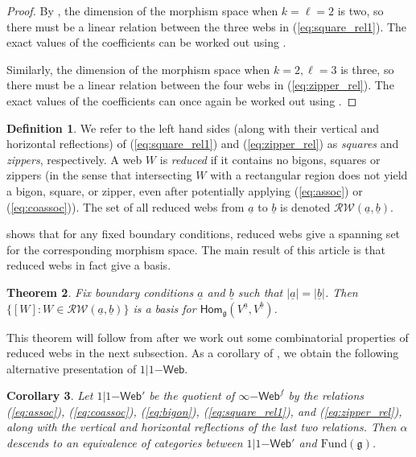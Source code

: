 \documentclass[11pt,a4paper,reqno]{amsart}
\newcommand{\g}{\mathfrak{g}}
\renewcommand{\a}{\alpha}
\renewcommand{\b}{\mathfrak{b}}
\numberwithin{equation}{section}
\renewcommand{\hom}{\mathsf{Hom}}
\renewcommand{\a}{\underline a}
\renewcommand{\b}{\underline b}
\newcommand{\RW}{\mathcal{RW}}
\newtheorem{thm}{Theorem}[section]
\newtheorem{corollary}[thm]{Corollary}
\theoremstyle{definition}
\newtheorem{definition}[thm]{Definition}
\theoremstyle{remark}
\begin{document}
\begin{proof}
    By , the dimension of the morphism space when $k = \ell = 2$ is two, so there must be a linear relation between the three webs in (\ref{eq:square_rel1}). The exact values of the coefficients can be worked out using .

    Similarly, the dimension of the morphism space when $k = 2, \ell = 3$ is three, so there must be a linear relation between the four webs in (\ref{eq:zipper_rel}). The exact values of the coefficients can once again be worked out using .
\end{proof}

\begin{definition}
    We refer to the left hand sides (along with their vertical and horizontal reflections) of (\ref{eq:square_rel1}) and (\ref{eq:zipper_rel}) as \emph{squares} and \emph{zippers}, respectively.
    A web $W$ is \emph{reduced} if it contains no bigons, squares or zippers (in the sense that intersecting $W$ with a rectangular region does not yield a bigon, square, or zipper, even after potentially applying (\ref{eq:assoc}) or (\ref{eq:coassoc})). The set of all reduced webs from $\underline a$ to $\underline b$ is denoted $\RW(\a,\b)$.
\end{definition}

 shows that for any fixed boundary conditions, reduced webs give a spanning set for the corresponding morphism space. The main result of this article is that reduced webs in fact give a basis.

\begin{thm}\label{thm:basis}
    Fix boundary conditions $\underline a$ and $\underline b$ such that $|\underline a| = |\underline b|$. Then $\{[W]: W\in \RW(\a,\b)\}$ is a basis for $\hom_\g(V^{\underline a}, V^{\underline b})$.
\end{thm}

This theorem will follow from  after we work out some combinatorial properties of reduced webs in the next subsection. As a corollary of , we obtain the following alternative presentation of $1|1\mathsf{-Web}$.

\begin{corollary}\label{cor:alt_presentation}
    Let $1|1\mathsf{-Web}'$ be the quotient of $\infty\mathsf{-Web}^f$ by the relations (\ref{eq:assoc}), (\ref{eq:coassoc}), (\ref{eq:bigon}), (\ref{eq:square_rel1}), and (\ref{eq:zipper_rel}), along with the vertical and horizontal reflections of the last two relations. Then $\alpha$ descends to an equivalence of categories between $1|1\mathsf{-Web}'$ and $\mathrm{Fund}(\g)$.
\end{corollary}
\end{document}
